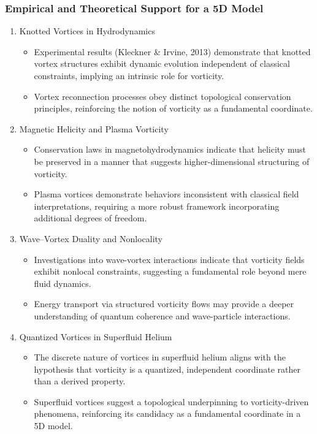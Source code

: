 \subsubsection*{Empirical and Theoretical Support for a 5D Model}
\begin{enumerate}
    \item Knotted Vortices in Hydrodynamics
    \begin{itemize}
        \item Experimental results (Kleckner & Irvine, 2013) demonstrate that knotted vortex structures exhibit dynamic evolution independent of classical constraints, implying an intrinsic role for vorticity.
        \item Vortex reconnection processes obey distinct topological conservation principles, reinforcing the notion of vorticity as a fundamental coordinate.
    \end{itemize}

    \item Magnetic Helicity and Plasma Vorticity
    \begin{itemize}
        \item Conservation laws in magnetohydrodynamics indicate that helicity must be preserved in a manner that suggests higher-dimensional structuring of vorticity.
        \item Plasma vortices demonstrate behaviors inconsistent with classical field interpretations, requiring a more robust framework incorporating additional degrees of freedom.
    \end{itemize}

    \item Wave–Vortex Duality and Nonlocality
    \begin{itemize}
        \item Investigations into wave-vortex interactions indicate that vorticity fields exhibit nonlocal constraints, suggesting a fundamental role beyond mere fluid dynamics.
        \item Energy transport via structured vorticity flows may provide a deeper understanding of quantum coherence and wave-particle interactions.
    \end{itemize}

    \item Quantized Vortices in Superfluid Helium
    \begin{itemize}
        \item The discrete nature of vortices in superfluid helium aligns with the hypothesis that vorticity is a quantized, independent coordinate rather than a derived property.
        \item Superfluid vortices suggest a topological underpinning to vorticity-driven phenomena, reinforcing its candidacy as a fundamental coordinate in a 5D model.
    \end{itemize}
\end{enumerate}

